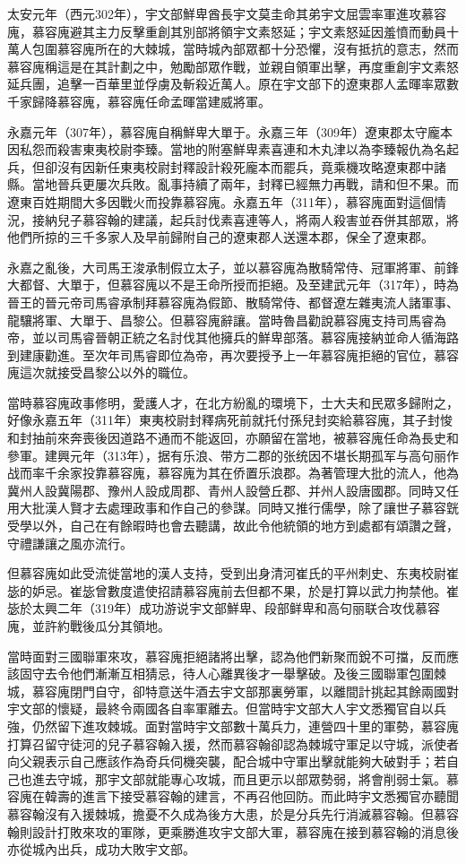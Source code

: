 太安元年（西元302年），宇文部鮮卑酋長宇文莫圭命其弟宇文屈雲率軍進攻慕容廆，慕容廆避其主力反擊重創其別部將領宇文素怒延；宇文素怒延因羞憤而動員十萬人包圍慕容廆所在的大棘城，當時城內部眾都十分恐懼，沒有抵抗的意志，然而慕容廆稱這是在其計劃之中，勉勵部眾作戰，並親自領軍出擊，再度重創宇文素怒延兵團，追擊一百華里並俘虜及斬殺近萬人。原在宇文部下的遼東郡人孟暉率眾數千家歸降慕容廆，慕容廆任命孟暉當建威將軍。

永嘉元年（307年），慕容廆自稱鮮卑大單于。永嘉三年（309年）遼東郡太守龐本因私怨而殺害東夷校尉李臻。當地的附塞鮮卑素喜連和木丸津以為李臻報仇為名起兵，但卻沒有因新任東夷校尉封釋設計殺死龐本而罷兵，竟乘機攻略遼東郡中諸縣。當地晉兵更屢次兵敗。亂事持續了兩年，封釋已經無力再戰，請和但不果。而遼東百姓期間大多因戰火而投靠慕容廆。永嘉五年（311年），慕容廆面對這個情況，接納兒子慕容翰的建議，起兵討伐素喜連等人，將兩人殺害並吞併其部眾，將他們所掠的三千多家人及早前歸附自己的遼東郡人送還本郡，保全了遼東郡。

永嘉之亂後，大司馬王浚承制假立太子，並以慕容廆為散騎常侍、冠軍將軍、前鋒大都督、大單于，但慕容廆以不是王命所授而拒絕。及至建武元年（317年），時為晉王的晉元帝司馬睿承制拜慕容廆為假節、散騎常侍、都督遼左雜夷流人諸軍事、龍驤將軍、大單于、昌黎公。但慕容廆辭讓。當時魯昌勸說慕容廆支持司馬睿為帝，並以司馬睿晉朝正統之名討伐其他擁兵的鮮卑部落。慕容廆接納並命人循海路到建康勸進。至次年司馬睿即位為帝，再次要授予上一年慕容廆拒絕的官位，慕容廆這次就接受昌黎公以外的職位。

當時慕容廆政事修明，愛護人才，在北方紛亂的環境下，士大夫和民眾多歸附之，好像永嘉五年（311年）東夷校尉封釋病死前就托付孫兒封奕給慕容廆，其子封悛和封抽前來奔喪後因道路不通而不能返回，亦願留在當地，被慕容廆任命為長史和參軍。建興元年（313年），据有乐浪、带方二郡的张统因不堪长期孤军与高句丽作战而率千余家投靠慕容廆，慕容廆为其在侨置乐浪郡。為著管理大批的流人，他為冀州人設冀陽郡、豫州人設成周郡、青州人設營丘郡、并州人設唐國郡。同時又任用大批漢人賢才去處理政事和作自己的參謀。同時又推行儒學，除了讓世子慕容皝受學以外，自己在有餘暇時也會去聽講，故此令他統領的地方到處都有頌讚之聲，守禮謙讓之風亦流行。

但慕容廆如此受流徙當地的漢人支持，受到出身清河崔氏的平州刺史、东夷校尉崔毖的妒忌。崔毖曾數度遣使招請慕容廆前去但都不果，於是打算以武力拘禁他。崔毖於太興二年（319年）成功游说宇文部鮮卑、段部鲜卑和高句丽联合攻伐慕容廆，並許約戰後瓜分其領地。

當時面對三國聯軍來攻，慕容廆拒絕諸將出擊，認為他們新聚而銳不可擋，反而應該固守去令他們漸漸互相猜忌，待人心離異後才一舉擊破。及後三國聯軍包圍棘城，慕容廆閉門自守，卻特意送牛酒去宇文部那裏勞軍，以離間計挑起其餘兩國對宇文部的懷疑，最終令兩國各自率軍離去。但當時宇文部大人宇文悉獨官自以兵強，仍然留下進攻棘城。面對當時宇文部數十萬兵力，連營四十里的軍勢，慕容廆打算召留守徒河的兒子慕容翰入援，然而慕容翰卻認為棘城守軍足以守城，派使者向父親表示自己應該作為奇兵伺機突襲，配合城中守軍出擊就能夠大破對手；若自己也進去守城，那宇文部就能專心攻城，而且更示以部眾勢弱，將會削弱士氣。慕容廆在韓壽的進言下接受慕容翰的建言，不再召他回防。而此時宇文悉獨官亦聽聞慕容翰沒有入援棘城，擔憂不久成為後方大患，於是分兵先行消滅慕容翰。但慕容翰則設計打敗來攻的軍隊，更乘勝進攻宇文部大軍，慕容廆在接到慕容翰的消息後亦從城內出兵，成功大敗宇文部。


